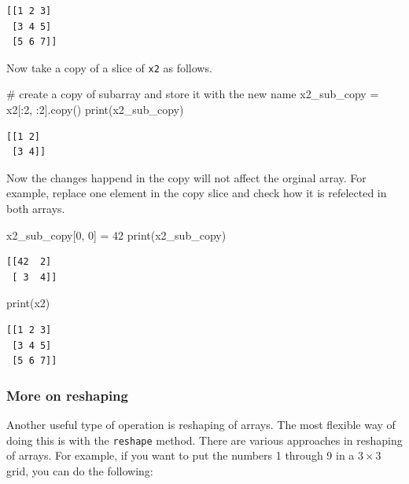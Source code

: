 \documentclass[
  letterpaper,
  DIV=11,
  numbers=noendperiod]{scrreprt}
\newenvironment{Shaded}{\begin{snugshade}}{\end{snugshade}}
\newcommand{\BuiltInTok}[1]{\textcolor[rgb]{0.00,0.23,0.31}{#1}}
\newcommand{\CommentTok}[1]{\textcolor[rgb]{0.37,0.37,0.37}{#1}}
\newcommand{\DecValTok}[1]{\textcolor[rgb]{0.68,0.00,0.00}{#1}}
\newcommand{\NormalTok}[1]{\textcolor[rgb]{0.00,0.23,0.31}{#1}}
\newcommand{\OperatorTok}[1]{\textcolor[rgb]{0.37,0.37,0.37}{#1}}
\theoremstyle{plain}
\theoremstyle{definition}
\theoremstyle{remark}
\begin{document}
\begin{verbatim}
[[1 2 3]
 [3 4 5]
 [5 6 7]]
\end{verbatim}

Now take a copy of a slice of \texttt{x2} as follows.

\begin{Shaded}
\begin{Highlighting}[]
\CommentTok{\# create a copy of subarray and store it with the new name}
\NormalTok{x2\_sub\_copy }\OperatorTok{=}\NormalTok{ x2[:}\DecValTok{2}\NormalTok{, :}\DecValTok{2}\NormalTok{].copy()}
\BuiltInTok{print}\NormalTok{(x2\_sub\_copy)}
\end{Highlighting}
\end{Shaded}

\begin{verbatim}
[[1 2]
 [3 4]]
\end{verbatim}

Now the changes happend in the copy will not affect the orginal array.
For example, replace one element in the copy slice and check how it is
refelected in both arrays.

\begin{Shaded}
\begin{Highlighting}[]
\NormalTok{x2\_sub\_copy[}\DecValTok{0}\NormalTok{, }\DecValTok{0}\NormalTok{] }\OperatorTok{=} \DecValTok{42}
\BuiltInTok{print}\NormalTok{(x2\_sub\_copy)}
\end{Highlighting}
\end{Shaded}

\begin{verbatim}
[[42  2]
 [ 3  4]]
\end{verbatim}

\begin{Shaded}
\begin{Highlighting}[]
\BuiltInTok{print}\NormalTok{(x2)}
\end{Highlighting}
\end{Shaded}

\begin{verbatim}
[[1 2 3]
 [3 4 5]
 [5 6 7]]
\end{verbatim}

\subsubsection{More on reshaping}\label{more-on-reshaping}

Another useful type of operation is reshaping of arrays. The most
flexible way of doing this is with the \texttt{reshape} method. There
are various approaches in reshaping of arrays. For example, if you want
to put the numbers 1 through 9 in a \(3 \times 3\) grid, you can do the
following:
\end{document}
